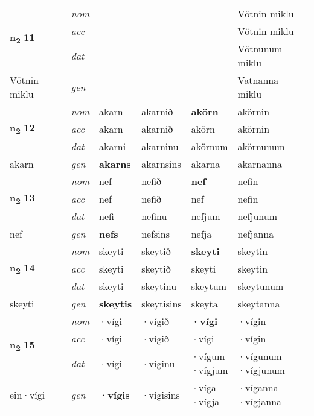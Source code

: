 \begin{longtable}[l]{X>{\footnotesize\itshape}XXXXX}
\multirow{3}{*}{{{\textbf{n{\textsubscript{2}}} \Large{\textbf{11}}}}} & nom &  &  & \textbf{} & Vötnin miklu \\*
 & acc &  &  &  & Vötnin miklu \\*
 & dat &  &  &  & Vötnunum miklu \\*
 {\footnotesize{Vötnin miklu}} & gen & \textbf{} &  &  & Vatnanna miklu \\
\cmidrule{1-6}

\multirow{3}{*}{{{\textbf{n{\textsubscript{2}}} \Large{\textbf{12}}}}} & nom & akarn & akarnið & \textbf{akörn} & akörnin \\*
 & acc & akarn & akarnið & akörn & akörnin \\*
 & dat & akarni & akarninu & akörnum & akörnunum \\*
 {\footnotesize{akarn}} & gen & \textbf{akarns} & akarnsins & akarna & akarnanna \\
\cmidrule{1-6}

\multirow{3}{*}{{{\textbf{n{\textsubscript{2}}} \Large{\textbf{13}}}}} & nom & nef & nefið & \textbf{nef} & nefin \\*
 & acc & nef & nefið & nef & nefin \\*
 & dat & nefi & nefinu & nefjum & nefjunum \\*
 {\footnotesize{nef}} & gen & \textbf{nefs} & nefsins & nefja & nefjanna \\
\cmidrule{1-6}

\multirow{3}{*}{{{\textbf{n{\textsubscript{2}}} \Large{\textbf{14}}}}} & nom & skeyti & skeytið & \textbf{skeyti} & skeytin \\*
 & acc & skeyti & skeytið & skeyti & skeytin \\*
 & dat & skeyti & skeytinu & skeytum & skeytunum \\*
 {\footnotesize{skeyti}} & gen & \textbf{skeytis} & skeytisins & skeyta & skeytanna \\
\cmidrule{1-6}

\multirow{3}{*}{{{\textbf{n{\textsubscript{2}}} \Large{\textbf{15}}}}} & nom & ·vígi & ·vígið & \textbf{·vígi} & ·vígin \\*
 & acc & ·vígi & ·vígið & ·vígi & ·vígin \\*
 & dat & ·vígi & ·víginu & \specialcell{·vígum\\  ·vígjum} & \specialcell{·vígunum\\  ·vígjunum} \\*
 {\footnotesize{ein\allowbreak ·vígi}} & gen & \textbf{·vígis} & ·vígisins & \specialcell{·víga\\  ·vígja} & \specialcell{·víganna\\  ·vígjanna} \\
\cmidrule{1-6}


\end{longtable}
